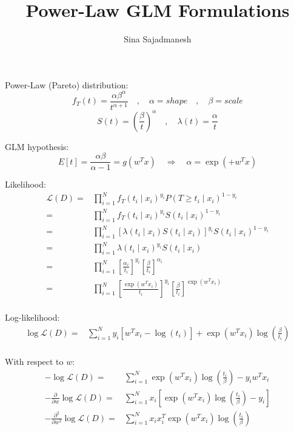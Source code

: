\documentclass[]{article}
\title{Power-Law GLM Formulations}
\author{Sina Sajadmanesh}
\begin{document}
\maketitle

Power-Law (Pareto) distribution:
\[f_T(t)=\frac{\alpha \beta^{\alpha}}{t^{\alpha+1}}\quad,\quad\alpha=shape\quad,\quad\beta=scale\]
\[S(t)=(\frac{\beta}{t})^\alpha\quad,\quad\lambda(t)=\frac{\alpha}{t}\]

GLM hypothesis:
\[E[t]=\frac{\alpha\beta}{\alpha-1}=g(w^Tx)\quad\Longrightarrow\quad\alpha=\exp(+w^Tx)\]

Likelihood:
\begin{equation*}
\begin{split}
\mathcal{L}(D)=&\prod_{i=1}^{N}f_T(t_i\mid x_i)^{y_i}P(T\ge t_i\mid x_i)^{1-y_i}\\
=&\prod_{i=1}^{N}f_T(t_i\mid x_i)^{y_i}S(t_i\mid x_i)^{1-y_i}\\
=&\prod_{i=1}^{N}[\lambda(t_i\mid x_i)S(t_i\mid x_i)]^{y_i}S(t_i\mid x_i)^{1-y_i}\\
=&\prod_{i=1}^{N}\lambda(t_i\mid x_i)^{y_i}S(t_i\mid x_i)\\
=&\prod_{i=1}^{N}\left[\frac{\alpha_i}{t_i}\right]^{y_i}\left[\frac{\beta}{t_i}\right]^{\alpha_i}\\
=&\prod_{i=1}^{N}\left[\frac{\exp(w^Tx_i)}{t_i}\right]^{y_i}\left[\frac{\beta}{t_i}\right]^{\exp(w^Tx_i)}\\
\end{split}
\end{equation*}

Log-likelihood:
\begin{equation*}
\begin{split}
\log\mathcal{L}(D)
=&\sum_{i=1}^{N}y_i\left[w^Tx_i-\log(t_i)\right]+\exp(w^Tx_i)\log(\frac{\beta}{t_i})\\
\end{split}
\end{equation*}

With respect to $w$:
\begin{equation*}
\begin{split}
-\log\mathcal{L}(D)=&\sum_{i=1}^{N}\exp(w^Tx_i)\log(\frac{t_i}{\beta})-y_iw^Tx_i\\
-\frac{\partial}{\partial w}\log\mathcal{L}(D)=&\sum_{i=1}^{N}x_i\left[\exp(w^Tx_i)\log(\frac{t_i}{\beta})-y_i\right]\\
-\frac{\partial^2}{\partial w^2}\log\mathcal{L}(D)=&\sum_{i=1}^{N}x_ix_i^T\exp(w^Tx_i)\log(\frac{t_i}{\beta})\\
\end{split}
\end{equation*}
\end{document}

